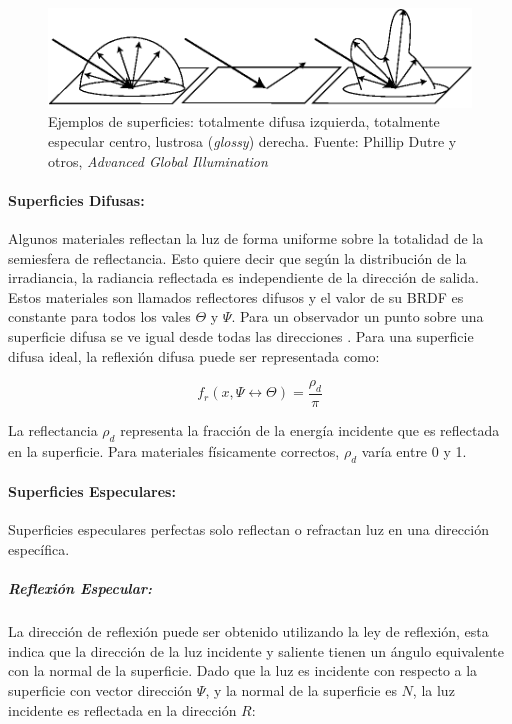 \begin{figure}[H]
	\centering
	\includegraphics[width=0.85\linewidth]{media/brdfs_types.eps}
	\caption{Ejemplos de superficies: totalmente difusa izquierda, totalmente especular centro, lustrosa (\emph{glossy}) derecha. Fuente: Phillip Dutre y otros, \emph{Advanced Global Illumination} \cite{advanced_gi2006}}
	\label{fig:brdf_types}
\end{figure}

\paragraph{Superficies Difusas:}
Algunos materiales reflectan la luz de forma uniforme sobre la totalidad de la semiesfera de reflectancia. Esto quiere decir que según la distribución de la irradiancia, la radiancia reflectada es independiente de la dirección de salida. Estos materiales son llamados reflectores difusos y el valor de su \ac{BRDF} es constante para todos los vales $\Theta$ y $\Psi$. Para un observador un punto sobre una superficie difusa se ve igual desde todas las direcciones \cite{advanced_gi2006}. Para una superficie difusa ideal, la reflexión difusa puede ser representada como:

\begin{equation}
    f_{r}(x, \Psi\leftrightarrow\Theta) = \frac{\rho_{d}}{\pi}
    \label{eq:diffuse_reflection}
\end{equation}

La reflectancia $\rho_{d}$ representa la fracción de la energía incidente que es reflectada en la superficie. Para materiales físicamente correctos, $\rho_{d}$ varía entre 0 y 1.

\paragraph{Superficies Especulares:}
\label{para:speculars}
Superficies especulares perfectas solo reflectan o refractan luz en una dirección específica.
\subparagraph{Reflexión Especular:}
La dirección de reflexión puede ser obtenido utilizando la ley de reflexión, esta indica que la dirección de la luz incidente y saliente tienen un ángulo equivalente con la normal de la superficie. Dado que la luz es incidente con respecto a la superficie con vector dirección $\Psi$, y la normal de la superficie es $N$, la luz incidente es reflectada en la dirección $R$:

